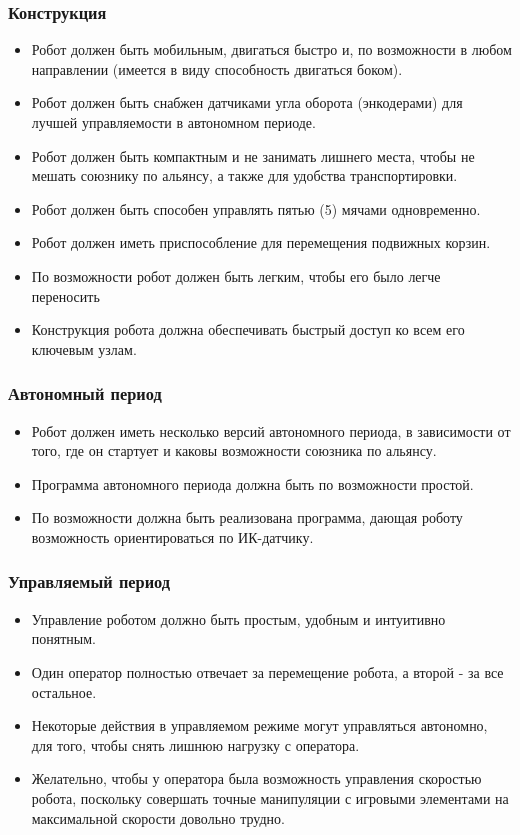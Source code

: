 \documentclass[11pt]{article}
\begin{document}
   \subsubsection{Конструкция}
   \begin{itemize}
      \item Робот должен быть мобильным, двигаться быстро и, по возможности в любом направлении (имеется в виду способность двигаться боком).
      \item Робот должен быть снабжен датчиками угла оборота (энкодерами) для лучшей управляемости в автономном периоде.
      \item Робот должен быть компактным и не занимать лишнего места, чтобы не мешать союзнику по альянсу, а также для удобства транспортировки.
      \item Робот должен быть способен управлять пятью (5) мячами одновременно.
      \item Робот должен иметь приспособление для перемещения подвижных корзин.
      \item По возможности робот должен быть легким, чтобы его было легче переносить
      \item Конструкция робота должна обеспечивать быстрый доступ ко всем его ключевым узлам.
   \end{itemize}
   \subsubsection{Автономный период}
     \begin{itemize}
        \item Робот должен иметь несколько версий автономного периода, в зависимости от того, где он стартует и каковы возможности союзника по альянсу.
        \item Программа автономного периода должна быть по возможности простой.
        \item По возможности должна быть реализована программа, дающая роботу возможность ориентироваться по ИК-датчику.
     \end{itemize}
     \subsubsection{Управляемый период}
       \begin{itemize}
          \item Управление роботом должно быть простым, удобным и интуитивно понятным.
          \item Один оператор полностью отвечает за перемещение робота, а второй - за все остальное.
          \item Некоторые действия в управляемом режиме могут управляться автономно, для того, чтобы снять лишнюю нагрузку с оператора.
          \item Желательно, чтобы у оператора была возможность управления скоростью робота, поскольку совершать точные манипуляции с игровыми элементами на максимальной скорости довольно трудно.
       \end{itemize}
\end{document}
